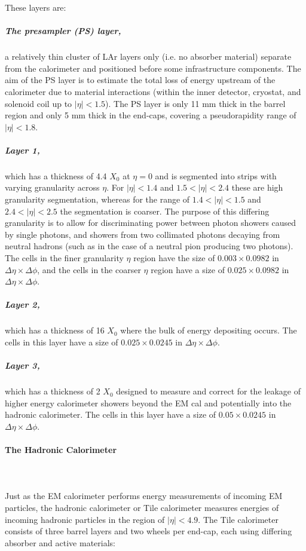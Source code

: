 \documentclass[12pt,a4paper,epsf,portrait,times,epsfig]{article}
\begin{document}

		These layers are:

		\subparagraph{The presampler (PS) layer,} a relatively thin cluster of LAr layers only (i.e. no absorber material) separate from the calorimeter and positioned before some infrastructure components. The aim of the PS layer is to estimate the total loss of energy upstream of the calorimeter due to material interactions (within the inner detector, cryostat, and solenoid coil up to $|\eta| < 1.5$). The PS layer is only 11 mm thick in the barrel region and only 5 mm thick in the end-caps, covering a pseudorapidity range of $|\eta| < 1.8$.
		
		\subparagraph{Layer 1,} which has a thickness of 4.4 $X_{0}$ at $\eta = 0$ and is segmented into strips with varying granularity across $\eta$. For $|\eta| < 1.4$ and $1.5 < |\eta| < 2.4$ these are high granularity segmentation, whereas for the range of $1.4 < |\eta| < 1.5$ and $2.4 < |\eta| < 2.5$ the segmentation is coarser. The purpose of this differing granularity is to allow for discriminating power between photon showers caused by single photons, and showers from two collimated photons decaying from neutral hadrons (such as in the case of a neutral pion producing two photons). The cells in the finer granularity $\eta$ region have the size of $0.003 \times 0.0982$ in $\Delta\eta \times \Delta\phi$, and the cells in the coarser $\eta$ region have a size of $0.025 \times 0.0982$ in $\Delta\eta \times \Delta\phi$. 
		
		\subparagraph{Layer 2,} which has a thickness of 16 $X_{0}$ where the bulk of energy depositing occurs. The cells in this layer have a size of $0.025 \times 0.0245$ in $\Delta\eta \times \Delta\phi$. 
		
		\subparagraph{Layer 3,} which has a thickness of 2 $X_{0}$ designed to measure and correct for the leakage of higher energy calorimeter showers beyond the EM cal and potentially into the hadronic calorimeter. The cells in this layer have a size of $0.05 \times 0.0245$ in $\Delta\eta \times \Delta\phi$. 
		
		\paragraph{The Hadronic Calorimeter}\label{Section:HCal}
		\mbox{}\\
		\mbox{} \\

		Just as the EM calorimeter performs energy measurements of incoming EM particles, the hadronic calorimeter or Tile calorimeter \cite{ATLASTileTDR} measures energies of incoming hadronic particles in the region of $|\eta| < 4.9$. The Tile calorimeter consists of three barrel layers and two wheels per end-cap, each using differing absorber and active materials:
		
\end{document}

